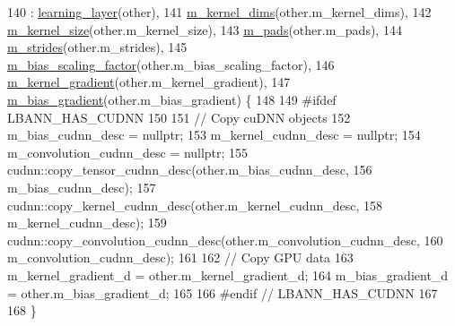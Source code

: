 \begin{DoxyCode}
140     : \hyperlink{classlbann_1_1learning__layer_a818a96b1d3daabb22b1e82c1c54c6268}{learning\_layer}(other),
141       \hyperlink{classlbann_1_1base__convolution__layer_a283edb6a476f975e713d0b4235ac658f}{m\_kernel\_dims}(other.m\_kernel\_dims),
142       \hyperlink{classlbann_1_1base__convolution__layer_aa9da3e44499643a86bd611b5eb500dd4}{m\_kernel\_size}(other.m\_kernel\_size),
143       \hyperlink{classlbann_1_1base__convolution__layer_a9732a8a0170a413bf0cde0128ad2a571}{m\_pads}(other.m\_pads),
144       \hyperlink{classlbann_1_1base__convolution__layer_a2429495822363e41f1f6b96a6b430445}{m\_strides}(other.m\_strides),
145       \hyperlink{classlbann_1_1base__convolution__layer_a5abe0bcd128b66a41fa481b28a9c2104}{m\_bias\_scaling\_factor}(other.m\_bias\_scaling\_factor),
146       \hyperlink{classlbann_1_1base__convolution__layer_a4129f11df61ed92bcad24ae855d7bd11}{m\_kernel\_gradient}(other.m\_kernel\_gradient),
147       \hyperlink{classlbann_1_1base__convolution__layer_a2ee1db4a1a74f167e3472d5ed7075179}{m\_bias\_gradient}(other.m\_bias\_gradient) \{
148 
149 \textcolor{preprocessor}{  #ifdef LBANN\_HAS\_CUDNN}
150 
151     \textcolor{comment}{// Copy cuDNN objects}
152     m\_bias\_cudnn\_desc = \textcolor{keyword}{nullptr};
153     m\_kernel\_cudnn\_desc = \textcolor{keyword}{nullptr};
154     m\_convolution\_cudnn\_desc = \textcolor{keyword}{nullptr};
155     cudnn::copy\_tensor\_cudnn\_desc(other.m\_bias\_cudnn\_desc,
156                                   m\_bias\_cudnn\_desc);
157     cudnn::copy\_kernel\_cudnn\_desc(other.m\_kernel\_cudnn\_desc,
158                                   m\_kernel\_cudnn\_desc);
159     cudnn::copy\_convolution\_cudnn\_desc(other.m\_convolution\_cudnn\_desc,
160                                        m\_convolution\_cudnn\_desc);
161 
162     \textcolor{comment}{// Copy GPU data}
163     m\_kernel\_gradient\_d = other.m\_kernel\_gradient\_d;
164     m\_bias\_gradient\_d = other.m\_bias\_gradient\_d;
165 
166 \textcolor{preprocessor}{  #endif // LBANN\_HAS\_CUDNN}
167 
168   \}
\end{DoxyCode}
\mbox{\label{classlbann_1_1base__convolution__layer_a2622ff3205a5feba6e75f86ec2e3c0d8}} 
